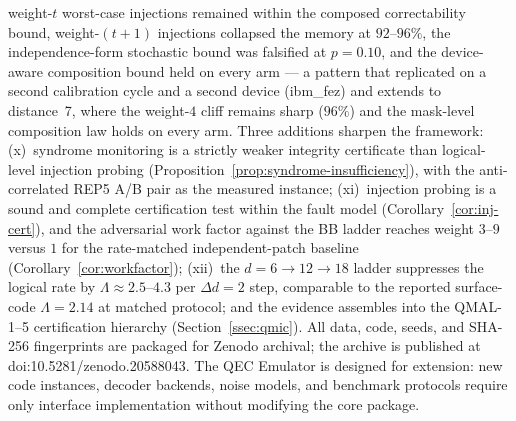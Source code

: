 \documentclass[11pt,a4paper]{article}
\begin{document}
weight-$t$ worst-case injections remained within the composed
correctability bound, weight-$(t{+}1)$ injections collapsed the memory
at $92$--$96\%$, the independence-form stochastic bound was falsified
at $p=0.10$, and the device-aware composition bound held on every arm
--- a pattern that replicated on a second calibration cycle and a second
device (ibm\_fez) and extends to distance~7, where the weight-$4$
cliff remains sharp ($96\%$) and the mask-level composition law holds
on every arm.
Three additions sharpen the framework: (x)~syndrome monitoring is a
strictly weaker integrity certificate than logical-level injection
probing (Proposition~\ref{prop:syndrome-insufficiency}), with the
anti-correlated REP5 A/B pair as the measured instance; (xi)~injection
probing is a sound and complete certification test within the fault
model (Corollary~\ref{cor:inj-cert}), and the adversarial work factor
against the BB ladder reaches weight $3$--$9$ versus $1$ for the
rate-matched independent-patch baseline (Corollary~\ref{cor:workfactor});
(xii)~the $d=6{\to}12{\to}18$ ladder suppresses the logical rate by
$\Lambda\approx2.5$--$4.3$ per $\Delta d=2$ step, comparable to the
reported surface-code $\Lambda=2.14$ at matched protocol; and the
evidence assembles into the QMAL-1--5 certification hierarchy
(Section~\ref{ssec:qmic}).
All data, code, seeds, and SHA-256 fingerprints are packaged for Zenodo archival; the archive is published at doi:10.5281/zenodo.20588043.
The QEC Emulator is designed for extension: new code instances, decoder
backends, noise models, and benchmark protocols require only interface
implementation without modifying the core package.
\end{document}

